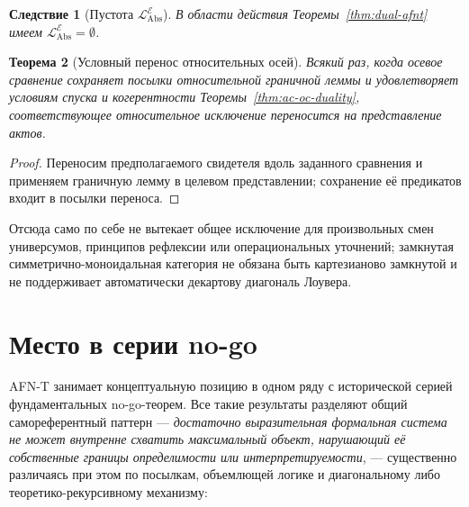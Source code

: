 \documentclass[11pt]{article}
\theoremstyle{plain}
\newtheorem{theorem}{Теорема}[section]
\newtheorem{corollary}[theorem]{Следствие}
\theoremstyle{definition}
\newcommand{\LAbs}{\mathcal{L}_{\mathrm{Abs}}}
\newcommand{\cE}{\mathcal{E}}
\newcommand{\LAbsE}{\LAbs^{\cE}}
\begin{document}
\begin{corollary}[Пустота $\LAbsE$]\label{cor:level6-empty-cE}
В области действия Теоремы~\ref{thm:dual-afnt} имеем $\LAbsE = \emptyset$.
\end{corollary}

\begin{theorem}[Условный перенос относительных осей]\label{thm:dual-five-axis}
Всякий раз, когда осевое сравнение сохраняет посылки относительной граничной леммы и удовлетворяет условиям спуска и когерентности Теоремы~\ref{thm:ac-oc-duality}, соответствующее относительное исключение переносится на представление актов.
\end{theorem}
\begin{proof}
Переносим предполагаемого свидетеля вдоль заданного сравнения и применяем граничную лемму в целевом представлении; сохранение её предикатов входит в посылки переноса.
\end{proof}
Отсюда само по себе не вытекает общее исключение для произвольных смен универсумов, принципов рефлексии или операциональных уточнений; замкнутая симметрично-моноидальная категория не обязана быть картезианово замкнутой и не поддерживает автоматически декартову диагональ Лоувера.

\section{Место в серии no-go}\label{sec:series}

AFN-T занимает концептуальную позицию в одном ряду с исторической серией фундаментальных no-go-теорем. Все такие результаты разделяют общий самореферентный паттерн --- \emph{достаточно выразительная формальная система не может внутренне схватить максимальный объект, нарушающий её собственные границы определимости или интерпретируемости}, --- существенно различаясь при этом по посылкам, объемлющей логике и диагональному либо теоретико-рекурсивному механизму:
\end{document}
